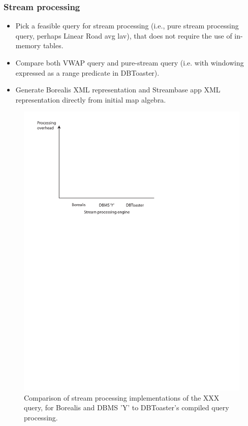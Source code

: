 {\subsubsection{Stream processing}
\begin{itemize}
\item Pick a feasible query for stream processing (i.e., pure stream processing
  query, perhaps Linear Road avg lav), that does not require the use of
  in-memory tables.
\item Compare both VWAP query and pure-stream query (i.e. with windowing
  expressed as a range predicate in DBToaster).
\item Generate Borealis XML representation and Streambase app XML representation
  directly from initial map algebra.
\end{itemize}

\begin{figure}
\includegraphics[scale=0.6]{figures/axes-streams.pdf}
\caption{Comparison of stream processing implementations of the XXX query, for
  Borealis and DBMS 'Y' to DBToaster's compiled query processing.}
\label{fig:overhead-stream}
\end{figure}
}